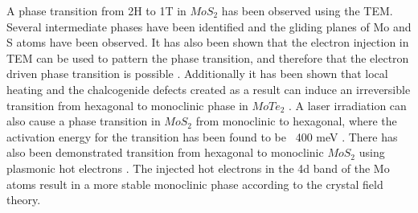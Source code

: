 A phase transition from 2H to 1T in $MoS_2$ has been observed using the TEM. Several intermediate phases have been identified and the gliding planes of Mo and S atoms have been observed. It has also been shown that the electron injection in TEM can be used to pattern the phase transition, and therefore that the electron driven phase transition is possible \cite{Lin2014}. Additionally it has been shown that local heating and the chalcogenide defects created as a result can induce an irreversible transition from hexagonal to monoclinic phase in $MoTe_2$ \cite{Cho2015}. A laser irradiation can also cause a phase transition in $MoS_2$ from monoclinic to hexagonal, where the activation energy for the transition has been found to be ~400 meV \cite{Guo2015}. There has also been demonstrated transition from hexagonal to monoclinic $MoS_2$ using plasmonic hot electrons \cite{Kang2014}. The injected hot electrons in the 4d band of the Mo atoms result in a more stable monoclinic phase according to the crystal field theory. 